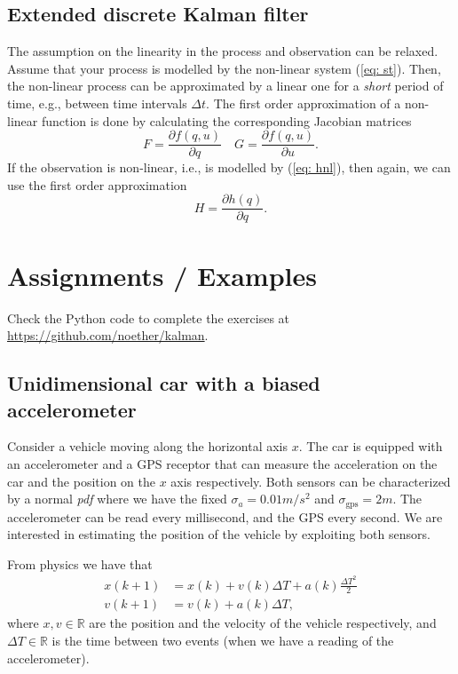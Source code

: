 \documentclass[11pt,a4paper]{article}
\begin{document}
\subsection{Extended discrete Kalman filter}
The assumption on the linearity in the process and observation can be relaxed. Assume that your process is modelled by the non-linear system (\ref{eq: st}). Then, the non-linear process can be approximated by a linear one for a \emph{short} period of time, e.g., between time intervals $\Delta t$. The first order approximation of a non-linear function is done by calculating the corresponding Jacobian matrices
\begin{equation}
	F = \frac{\partial f(q,u)}{\partial q} \quad G =  \frac{\partial f(q,u)}{\partial u}.
\end{equation}
If the observation is non-linear, i.e., is modelled by (\ref{eq: hnl}), then again, we can use the first order approximation
\begin{equation}
	H = \frac{\partial h(q)}{\partial q}.
\end{equation}

\section{Assignments / Examples}
Check the Python code to complete the exercises at \url{https://github.com/noether/kalman}.

\subsection{Unidimensional car with a biased accelerometer}
Consider a vehicle moving along the horizontal axis $x$. The car is equipped with an accelerometer and a GPS receptor that can measure the acceleration on the car and the position on the $x$ axis respectively. Both sensors can be characterized by a normal \emph{pdf} where we have the fixed $\sigma_{a} = 0.01 m/s^2$ and $\sigma_{\text{gps}} = 2 m$. The accelerometer can be read every millisecond, and the GPS every second. We are interested in estimating the position of the vehicle by exploiting both sensors.

From physics we have that
\begin{align}
		x(k+1) &= x(k) + v(k)\Delta T + a(k)\frac{\Delta T^2}{2} \\
		v(k+1) &= v(k) + a(k)\Delta T,
\end{align}
where $x,v\in\mathbb{R}$ are the position and the velocity of the vehicle respectively, and $\Delta T\in\mathbb{R}$ is the time between two events (when we have a reading of the accelerometer).
\end{document}
